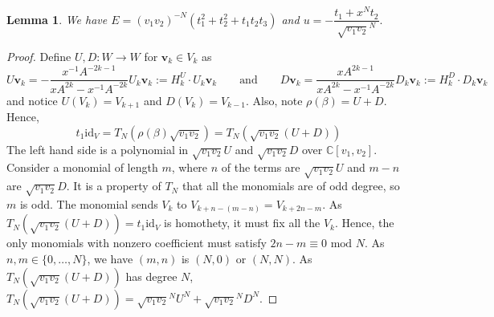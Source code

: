 \documentclass[10pt,a4paper]{amsart}
\newtheorem{lemma}{Lemma}
\newcommand{\C}{\mathbb{C}}
\newcommand{\id}{\text{id}}
\renewcommand{\v}{\mathbf{v}}
\begin{document}
\begin{lemma}\label{lem:calculate-u}
	We have $E=(v_1v_2)^{-N}(t_1^2 +t_2^2 +t_1t_2t_3)$ and $u=-\dfrac{t_1+x^Nt_2}{\sqrt{v_1v_2}^N}.$
\end{lemma}

\begin{proof}
    Define $U,D:W\to W$ for $\v_k\in V_k$ as
\[        U\v_k=-\frac{x^{-1}A^{-2k-1}}{xA^{2k}-x^{-1}A^{-2k}}U_k\v_k:=H^U_k\cdot U_k\v_k
\qquad \text{and}\qquad
        D\v_k=\frac{xA^{2k-1}}{xA^{2k}-x^{-1}A^{-2k}}D_k\v_k:=H_k^D\cdot D_k\v_k
 \]
    and notice $U(V_k)=V_{k+1}$ and $D(V_k)=V_{k-1}$. Also, note $\rho(\beta)=U+D$. Hence,
    \[
    t_1\id_V=T_N(\rho(\beta)\sqrt{v_1v_2})=T_N(\sqrt{v_1v_2}(U+D))
    \]
    The left hand side is a polynomial in $\sqrt{v_1v_2}U$ and $\sqrt{v_1v_2}D$ over $\C[v_1,v_2]$. Consider a monomial of length $m$, where $n$ of the terms are $\sqrt{v_1v_2}U$ and $m-n$ are $\sqrt{v_1v_2}D$. It is a property of $T_N$ that all the monomials are of odd degree, so $m$ is odd. The monomial sends $V_k$ to $V_{k+n-(m-n)}=V_{k+2n-m}$. As $T_N(\sqrt{v_1v_2}(U+D))=t_1\id_V$ is homothety, it must fix all the $V_k$. Hence, the only monomials with nonzero coefficient must satisfy $2n-m\equiv 0\text{ mod }N$. As $n,m\in \{0,\ldots,N\}$, we have $(m,n)$ is $(N,0)$ or $(N,N)$. As $T_N(\sqrt{v_1v_2}(U+D))$ has degree $N$, $T_N(\sqrt{v_1v_2}(U+D))=\sqrt{v_1v_2}^{N}U^N+\sqrt{v_1v_2}^{N}D^N$. 
   

\end{proof}
\end{document}
